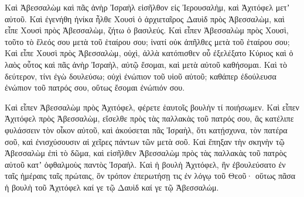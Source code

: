 {\par }{\PP {}Καὶ Ἀβεσσαλὼμ καὶ πᾶς ἀνὴρ Ἰσραὴλ εἰσῆλθον εἰς Ἰερουσαλὴμ, καὶ Ἀχιτόφελ μετʼ αὐτοῦ.
Καὶ ἐγενήθη ἡνίκα ἦλθε Χουσὶ ὁ ἀρχιεταῖρος Δαυὶδ πρὸς Ἀβεσσαλὼμ, καὶ εἶπε Χουσὶ πρὸς Ἀβεσσαλὼμ, ζήτω ὁ βασιλεύς.
Καὶ εἶπεν Ἀβεσσαλὼμ πρὸς Χουσὶ, τοῦτο τὸ ἔλεός σου μετὰ τοῦ ἑταίρου σου; ἱνατί οὐκ ἀπῆλθες μετὰ τοῦ ἑταίρου σου;
Καὶ εἶπε Χουσὶ πρὸς Ἀβεσσαλὼμ, οὐχὶ, ἀλλὰ κατόπισθεν οὗ ἐξελέξατο Κύριος καὶ ὁ λαὸς οὗτος καὶ πᾶς ἀνὴρ Ἰσραὴλ, αὐτῷ ἔσομαι, καὶ μετὰ αὐτοῦ καθήσομαι.
Καὶ τὸ δεύτερον, τίνι ἐγὼ δουλεύσω; οὐχὶ ἐνώπιον τοῦ υἱοῦ αὐτοῦ; καθάπερ ἐδούλευσα ἐνώπιον τοῦ πατρός σου, οὕτως ἔσομαι ἐνώπιόν σου.
\par }{\PP {}Καὶ εἶπεν Ἀβεσσαλὼμ πρὸς Ἀχιτόφελ, φέρετε ἑαυτοῖς βουλὴν τί ποιήσωμεν.
Καὶ εἶπεν Ἀχιτόφελ πρὸς Ἀβεσσαλὼμ, εἴσελθε πρὸς τὰς παλλακὰς τοῦ πατρός σου, ἃς κατέλιπε φυλάσσειν τὸν οἶκον αὐτοῦ, καὶ ἀκούσεται πᾶς Ἰσραὴλ, ὅτι κατῄσχυνα, τὸν πατέρα σοῦ, καὶ ἐνισχύσουσιν αἱ χεῖρες πάντων τῶν μετὰ σοῦ.
Καὶ ἔπηξαν τὴν σκηνὴν τῷ Ἀβεσσαλὼμ ἐπὶ τὸ δῶμα, καὶ εἰσῆλθεν Ἀβεσσαλὼμ πρὸς τὰς παλλακὰς τοῦ πατρὸς αὐτοῦ κατʼ ὀφθαλμοὺς παντὸς Ἰσραήλ.
Καὶ ἡ βουλὴ Ἀχιτόφελ, ἣν ἐβουλεύσατο ἐν ταῖς ἡμέραις ταῖς πρώταις, ὃν τρόπον ἐπερωτήσῃ τις ἐν λόγῳ τοῦ Θεοῦ· οὕτως πᾶσα ἡ βουλὴ τοῦ Ἀχιτόφελ καί γε τῷ Δαυὶδ καί γε τῷ Ἀβεσσαλώμ.

}
